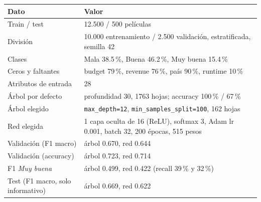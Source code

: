 \documentclass[11pt,a4paper]{article}
\begin{document}
\begin{center}
\small
\begin{tabularx}{\linewidth}{@{}l X@{}}
\toprule
Dato & Valor \\
\midrule
Train / test                    & 12.500 / 500 películas \\
División                        & 10.000 entrenamiento / 2.500 validación, estratificada, semilla 42 \\
Clases                          & Mala 38.5\,\%, Buena 46.2\,\%, Muy buena 15.4\,\% \\
Ceros y faltantes               & budget 79\,\%, revenue 76\,\%, país 90\,\%, runtime 10\,\% \\
Atributos de entrada            & 28 \\
Árbol por defecto               & profundidad 30, 1763 hojas; accuracy 100\,\% / 67\,\% \\
Árbol elegido                   & \texttt{max\_depth=12}, \texttt{min\_samples\_split=100}, 162 hojas \\
Red elegida                     & 1 capa oculta de 16 (ReLU), softmax 3, Adam lr 0.001, batch 32, 200 épocas, 515 pesos \\
Validación (F1 macro)           & árbol 0.670, red 0.644 \\
Validación (accuracy)           & árbol 0.723, red 0.714 \\
F1 \textit{Muy buena}           & árbol 0.499, red 0.422 (recall 39\,\% y 32\,\%) \\
Test (F1 macro, solo informativo) & árbol 0.669, red 0.622 \\
\bottomrule
\end{tabularx}
\end{center}
\end{document}
